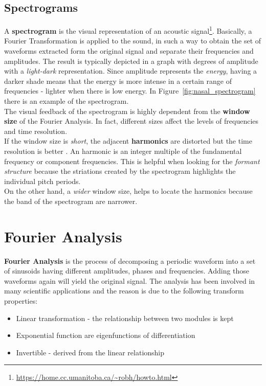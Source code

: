 \subsection{Spectrograms}
\label{sec:spectrograms}
A \textbf{spectrogram} is the visual representation of an acoustic signal\footnote{\url{https://home.cc.umanitoba.ca/~robh/howto.html}}. Basically, a Fourier Transformation is applied to the sound, in such a way to obtain the set of waveforms extracted form the original signal and separate their frequencies and amplitudes. The result is typically depicted in a graph with degrees of amplitude with a \textit{light-dark} representation. Since amplitude represents the \textit{energy}, having a darker shade means that the energy is more intense in a certain range of frequencies - lighter when there is low energy. In Figure~\ref{fig:nasal_spectrogram} there is an example of the spectrogram. \\
\noindent The visual feedback of the spectrogram is highly dependent from the \textbf{window size} of the Fourier Analysis. In fact, different sizes affect the levels of frequencies and time resolution. \\
\noindent If the window size is \textit{short}, the adjacent \textbf{harmonics} are distorted but the time resolution is better \cite{spectrogram_def}. An harmonic is an integer multiple of the fundamental frequency or component frequencies. This is helpful when looking for the \textit{formant structure} because the striations created by the spectrogram highlights the individual pitch periods. \\
\noindent On the other hand, a \textit{wider} window size, helps to locate the harmonics because the band of the spectrogram are narrower.


\section{Fourier Analysis}
\label{sec:fourier_analysis}
\textbf{Fourier Analysis} is the process of decomposing a periodic waveform into a set of sinusoids having different amplitudes, phases and frequencies. Adding those waveforms again will yield the original signal. The analysis has been involved in many scientific applications and the reason is due to the following transform properties:

\begin{itemize}
	\item Linear transformation - the relationship between two modules is kept
	\item Exponential function are eigenfunctions of differentiation \cite{evans1997partial}
	\item Invertible - derived from the linear relationship
\end{itemize}

